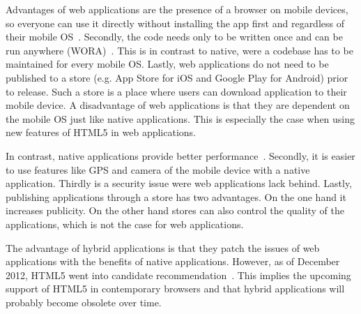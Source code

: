 \documentclass[a4paper]{artikel3}
\begin{document}
Advantages of web applications are the presence of a browser on mobile devices, so everyone can use it directly without installing the app first and regardless of their mobile OS~\cite{Accenture2012}.
Secondly, the code needs only to be written once and can be run anywhere (WORA)~\cite{Hales2012}.
This is in contrast to native, were a codebase has to be maintained for every mobile OS.
Lastly, web applications do not need to be published to a store (e.g. App Store for iOS and Google Play for Android) prior to release.
Such a store is a place where users can download application to their mobile device.
A disadvantage of web applications is that they are dependent on the mobile OS just like native applications.
This is especially the case when using new features of HTML5 in web applications.

In contrast, native applications provide better performance~\cite{Accenture2012}.
Secondly, it is easier to use features like GPS and camera of the mobile device with a native application.
Thirdly is a security issue were web applications lack behind.
Lastly, publishing applications through a store has two advantages.
On the one hand it increases publicity.
On the other hand stores can also control the quality of the applications, which is not the case for web applications.

The advantage of hybrid applications is that they patch the issues of web applications with the benefits of native applications.
However, as of December 2012, HTML5 went into candidate recommendation~\cite{Jacobs2012}.
This implies the upcoming support of HTML5 in contemporary browsers and that hybrid applications will probably become obsolete over time.
\end{document}
